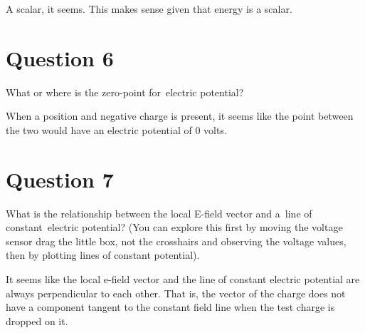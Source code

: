 \documentclass[letterpaper]{article}
\begin{document}
A scalar, it seems. This makes sense given that energy is a scalar.

\section{Question 6}
\label{sec:orgfc35c5f}
What or where is the zero-point for electric potential?

When a position and negative charge is present, it seems like the point
between the two would have an electric potential of 0 volts.

\section{Question 7}
\label{sec:orga6c47c7}
What is the relationship between the local E-field vector and a line of
constant electric potential? (You can explore this first by moving the
voltage sensor drag the little box, not the crosshairs and observing the
voltage values, then by plotting lines of constant potential).

It seems like the local e-field vector and the line of constant electric
potential are always perpendicular to each other. That is, the vector of
the charge does not have a component tangent to the constant field line
when the test charge is dropped on it.
\end{document}
